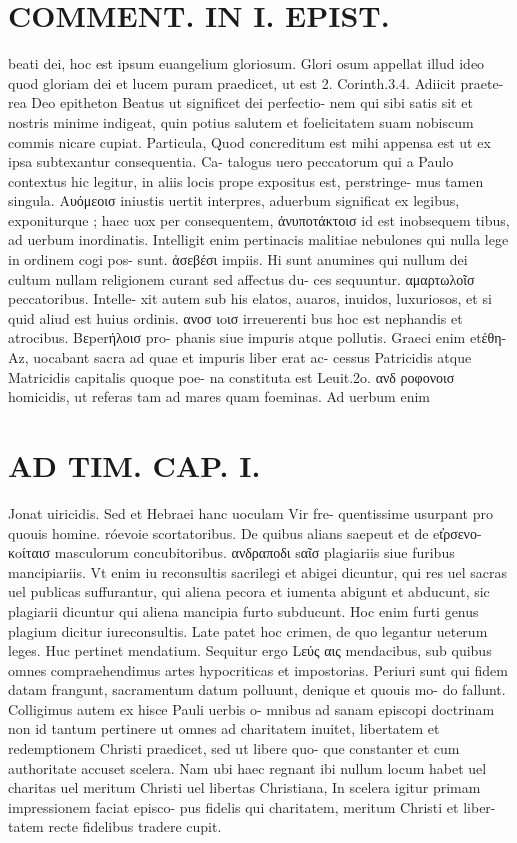 \documentclass{article}
\begin{document}
\begin{pages}
\section*{COMMENT. IN I. EPIST. }\pstart beati dei, hoc est ipsum euangelium gloriosum. Glori osum appellat illud ideo quod gloriam dei et lucem puram praedicet, ut est 2. Corinth.3.4. Adiicit praete- rea Deo epitheton Beatus ut significet dei perfectio- nem qui sibi satis sit et nostris minime indigeat, quin potius salutem et foelicitatem suam nobiscum commis nicare cupiat. Particula, Quod concreditum est mihi appensa est ut ex ipsa subtexantur consequentia. Ca- talogus uero peccatorum qui a Paulo contextus hic legitur, in aliis locis prope expositus est, perstringe- mus tamen singula. Aυόμεοισ iniustis uertit interpres, aduerbum significat ex legibus, exponiturque ; haec uox per consequentem, ἀνυποτάκτοισ id est inobsequem tibus, ad uerbum inordinatis. Intelligit enim pertinacis malitiae nebulones qui nulla lege in ordinem cogi pos- sunt. ἀσεβέσι impiis. Hi sunt anumines qui nullum dei cultum nullam religionem curant sed affectus du- ces sequuntur. αμαρτωλοῖσ peccatoribus. Intelle- xit autem sub his elatos, auaros, inuidos, luxuriosos, et si quid aliud est huius ordinis. ανοσ ιoισ irreuerenti bus hoc est nephandis et atrocibus. Βεperήλοισ pro- phanis siue impuris atque pollutis. Graeci enim etέθη- Az, uocabant sacra ad quae et impuris liber erat ac- cessus Patricidis atque Matricidis capitalis quoque poe- na constituta est Leuit.2o. ανδ ροφονοισ homicidis, ut referas tam ad mares quam foeminas. Ad uerbum enim  \pend
\section*{AD TIM. CAP. I. }
\marginpar{[ p.102 ]}\pstart Jonat uiricidis. Sed et Hebraei hanc uoculam Vir fre- quentissime usurpant pro quouis homine. róevoie scortatoribus. De quibus alians saepeut et de et̓ρσενο- κoίταισ masculorum concubitoribus. ανδραποδι sαῖσ plagiariis siue furibus mancipiariis. Vt enim iu reconsultis sacrilegi et abigei dicuntur, qui res uel sacras uel publicas suffurantur, qui aliena pecora et iumenta abigunt et abducunt, sic plagiarii dicuntur qui aliena mancipia furto subducunt. Hoc enim furti genus plagium dicitur iureconsultis. Late patet hoc crimen, de quo legantur ueterum leges. Huc pertinet mendatium. Sequitur ergo Lεύς αις mendacibus, sub quibus omnes compraehendimus artes hypocriticas et impostorias. Periuri sunt qui fidem datam frangunt, sacramentum datum polluunt, denique et quouis mo- do fallunt. Colligimus autem ex hisce Pauli uerbis o- mnibus ad sanam episcopi doctrinam non id tantum pertinere ut omnes ad charitatem inuitet, libertatem et redemptionem Christi praedicet, sed ut libere quo- que constanter et cum authoritate accuset scelera. Nam ubi haec regnant ibi nullum locum habet uel charitas uel meritum Christi uel libertas Christiana, In scelera igitur primam impressionem faciat episco- pus fidelis qui charitatem, meritum Christi et liber- tatem recte fidelibus tradere cupit.  \pend

\end{pages}
\end{document}
